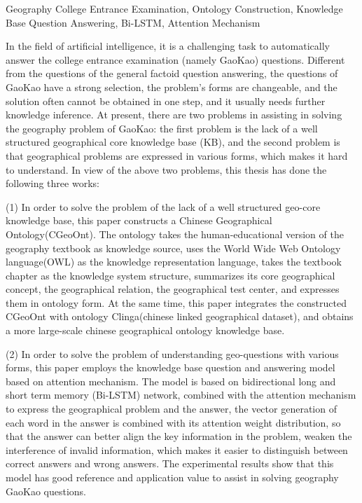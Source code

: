 \begin{englishabstract}{Geography College Entrance Examination, Ontology Construction, Knowledge Base Question Answering, Bi-LSTM, Attention Mechanism}

	In the field of artificial intelligence, it is a challenging task to automatically answer the college entrance examination (namely GaoKao) questions. Different from the questions of the general factoid question answering, the questions of GaoKao have a strong selection, the problem's forms are changeable, and the solution often cannot be obtained in one step, and it usually needs further knowledge inference. At present, there are two problems in assisting in solving the geography problem of GaoKao: the first problem is the lack of a well structured geographical core knowledge base (KB), and the second problem is that geographical problems are expressed in various forms, which makes it hard to understand. In view of the above two problems, this thesis has done the following three works:
	
(1) In order to solve the problem of the lack of a well structured geo-core knowledge base, this paper constructs a Chinese Geographical Ontology(CGeoOnt). The ontology takes the human-educational version of the geography textbook as knowledge source, uses the World Wide Web Ontology language(OWL) as the knowledge representation language, takes the textbook chapter as the knowledge system structure, summarizes its core geographical concept, the geographical relation, the geographical test center, and expresses them in ontology form. At the same time, this paper integrates the constructed CGeoOnt with ontology Clinga(chinese linked geographical dataset), and obtains a more large-scale chinese geographical ontology knowledge base.
	
(2) In order to solve  the problem of understanding geo-questions with various forms, this paper employs the knowledge base question and answering model based on attention mechanism. The model is based on bidirectional long and short term memory (Bi-LSTM) network, combined with the attention mechanism to express the geographical problem and the answer, the vector generation of each word in the answer is combined with its attention weight distribution, so that the answer can better align the key information in the problem, weaken the interference of invalid information, which makes it easier to distinguish between correct answers and wrong answers. The experimental results show that this model has good reference and application value to assist in solving geography GaoKao questions.


\end{englishabstract}
